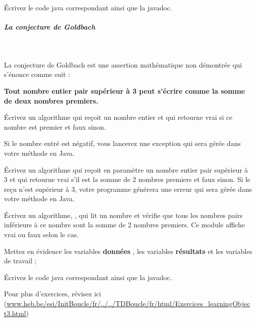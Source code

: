 \documentclass[11pt,a4paper]{article}
\begin{document}
            \par
        \'Ecrivez le code java correspondant ainsi que la javadoc.
            \par
        
			
		\subparagraph{La conjecture de Goldbach} 
		
					\textcolor{white}{.} \par
				
          La conjecture de Goldbach est une assertion math\'ematique non d\'emontr\'ee qui s'\'enonce comme suit :
        
            \par
        \textbf{Tout nombre entier pair sup\'erieur \`a 3 peut s'\'ecrire comme la somme de deux nombres premiers.}
            \par
        
          \'Ecrivez un algorithme \verb@isPremier@ qui re\c coit un nombre entier \verb@n@ 
          et qui retourne vrai si ce nombre est premier et faux sinon.
        
            \par
        Si le nombre entr\'e est n\'egatif, vous lancerez une exception qui sera g\'er\'ee dans votre m\'ethode 
        \verb@main@ en Java.
            \par
        
          \'Ecrivez un algorithme \verb@goldbach@ qui re\c coit en param\`etre 
          un nombre entier pair \verb@p@ sup\'erieur \`a 3 
          et qui retourne vrai s'il est la somme de 2 nombres premiers et faux sinon.
          Si le \verb@p@ re\c cu n'est sup\'erieur \`a 3, votre programme g\'en\'erera une erreur qui sera g\'er\'ee dans votre m\'ethode 
        \verb@main@ en Java.
            \par
        
          \'Ecrivez un algorithme, \verb@principal@, qui lit un nombre et v\'erifie que tous les
          nombres pairs inf\'erieurs \`a ce nombre sont la somme de 2 nombres premiers. Ce module affiche vrai ou faux selon le cas.
        
            \par
        
          Mettez en \'evidence les variables \textbf{\guillemotleft  donn\'ees \guillemotright }, 
          les variables \textbf{\guillemotleft  r\'esultats \guillemotright } et les variables de travail ;
        
            \par
        \'Ecrivez le code java correspondant ainsi que la javadoc.
            \par
        Pour plus d'exercices, 
        r\'evisez ici (\url{www.heb.be/esi/InitBoucle/fr/../../TDBoucle/fr/html/Exercices\_learningObject3.html})
            \par
        
				
\end{document}
